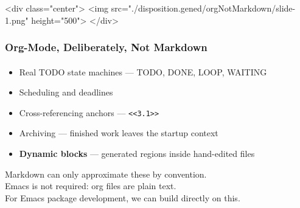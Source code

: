 \begin{whenOrg}
\begin{htmlonly}

\begin{frame}[fragile,plain,label=orgNotMarkdown]
    \frametitle{}
    \framesubtitle{}
    \begin{rawhtml}
<div class="center">
<img src="./disposition.gened/orgNotMarkdown/slide-1.png" height="500">
</div>
    \end{rawhtml}
\end{frame}
\end{htmlonly}

\begin{verblatex}

\begin{frame}[fragile,plain,label=orgNotMarkdown]
    \frametitle{Org-Mode, Deliberately, Not Markdown}
    \framesubtitle{}

\begin{itemize}
  \item Real TODO state machines --- TODO, DONE, LOOP, WAITING
  \item Scheduling and deadlines
  \item Cross-referencing anchors --- \texttt{<<3.1>>}
  \item Archiving --- finished work leaves the startup context
  \item \textbf{Dynamic blocks} --- generated regions inside hand-edited files
  \end{itemize}

  \vspace{0.1in}
  Markdown can only approximate these by convention.\\
  Emacs is not required: org files are plain text.\\
  For Emacs package development, we can build directly on this.

\end{frame}
\end{verblatex}
\end{whenOrg}
